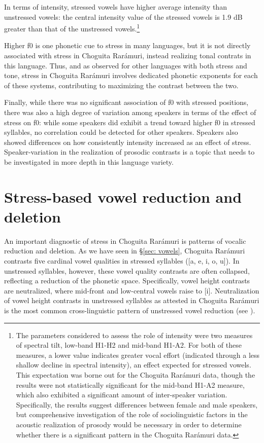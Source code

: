 In terms of intensity, stressed vowels have higher average intensity than unstressed vowels: the central intensity value of the stressed vowels is 1.9 dB greater than that of the unstressed vowels.\footnote{The parameters considered to assess the role of intensity were two measures of spectral tilt, low-band H1-H2 and mid-band H1-A2. For both of these measures, a lower value indicates greater vocal effort (indicated through a less shallow decline in spectral intensity), an effect expected for stressed vowels. This expectation was borne out for the Choguita Rarámuri data, though the results were not statistically significant for the mid-band H1-A2 measure, which also exhibited a significant amount of inter-speaker variation. Specifically, the results suggest differences between female and male speakers, but comprehensive investigation of the role of sociolinguistic factors in the acoustic realization of prosody would be necessary in order to determine whether there is a significant pattern in the Choguita Rarámuri data.}

Higher f0 is one phonetic cue to stress in many languages, but it is not directly associated with stress in Choguita Rarámuri, instead realizing tonal contrats in this language. Thus, and as observed for other languages with both stress and tone, stress in Choguita Rarámuri involves dedicated phonetic exponents for each of these systems, contributing to maximizing the contrast between the two.

Finally, while there was no significant association of f0 with stressed positions, there was also a high degree of variation among speakers in terms of the effect of stress on f0: while some speakers did exhibit a trend toward higher f0 in stressed syllables, no correlation could be detected for other speakers. Speakers also showed differences on how consistently intensity increased as an effect of stress. Speaker-variation in the realization of prosodic contrasts is a topic that needs to be investigated in more depth in this language variety.

\section{Stress-based vowel reduction and deletion}
\label{subsubsec: stress-based vowel reduction and deletion}

An important diagnostic of stress in Choguita Rarámuri is patterns of vocalic reduction and deletion. As we have seen in §\ref{sec: vowels}, Choguita Rarámuri contrasts five cardinal vowel qualities in stressed syllables ([a, e, i, o, u]). In unstressed syllables, however, these vowel quality contrasts are often collapsed, reflecting a reduction of the phonetic space. Specifically, vowel height contrasts are neutralized, where mid-front and low-central vowels raise to [i]. Neutralization of vowel height contrasts in unstressed syllables as attested in Choguita Rarámuri is the most common cross-linguistic pattern of unstressed vowel reduction (see \citealt{barnes2002positional,barnes2004vowel}).


